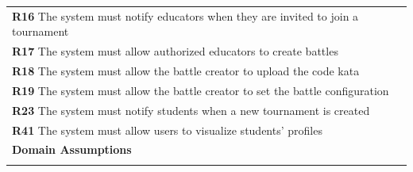 \begin{table}[H]
\begin{tabularx}{\textwidth}{X}
        \textbf{R16} The system must notify educators when they are invited to join a tournament      \\
        \textbf{R17} The system must allow authorized educators to create battles        \\ 
        \textbf{R18} The system must allow the battle creator to upload the code kata       \\
        \textbf{R19} The system must allow the battle creator to set the battle configuration       \\ 
        \textbf{R23} The system must notify students when a new tournament is created            \\
        \textbf{R41} The system must allow users to visualize students' profiles     \\
         \midrule


        
        \textbf{Domain Assumptions}                                                                                                  \\ \midrule
                                                   \\ \bottomrule
    \end{tabularx}
\end{table}

